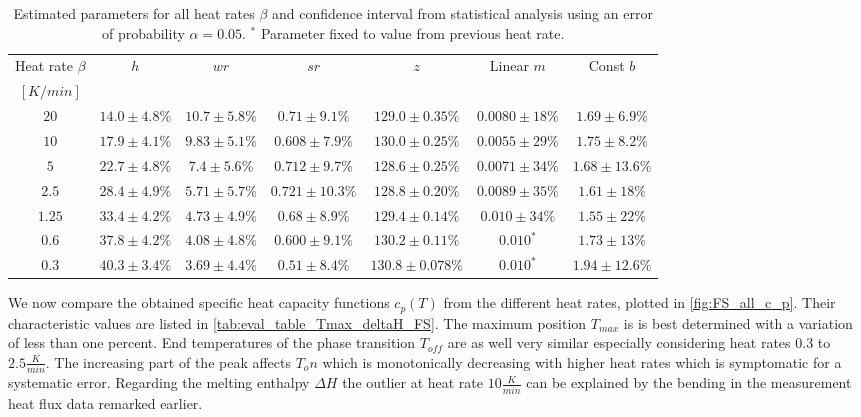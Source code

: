 \documentclass{scrartcl}[12pt, halfparskip]
\numberwithin{equation}{section}
\numberwithin{figure}{section}
\numberwithin{table}{section}
\begin{document}
\begin{table}[H]
	\hspace{-1.2cm}
	\begin{tabular}{| c | c | c | c | c | c | c |} \hline
		Heat rate $\beta$ & $h$ & $wr$ & $sr$ & $z$ & Linear $m$ & Const $b$ \\ 
		$[K/min]$ & & & & & & \\ \hline
		$20$ & $14.0 \pm 4.8\%$ & $10.7 \pm 5.8\%$ & $0.71 \pm 9.1\%$ & $129.0 \pm 0.35\%$ & $0.0080 \pm 18\%$ & $1.69 \pm 6.9\%$ \\
		$10$ & $17.9 \pm 4.1\%$ & $9.83 \pm 5.1\%$ & $0.608 \pm 7.9\%$ & $130.0 \pm 0.25\%$ & $0.0055 \pm 29\%$ & $1.75 \pm 8.2\%$  \\
		$5$ & $22.7 \pm 4.8\%$ & $7.4 \pm 5.6\%$ & $0.712 \pm 9.7\%$ & $128.6 \pm 0.25\%$ & $0.0071 \pm 34\%$ & $1.68 \pm 13.6\%$ \\
		$2.5$ & $28.4 \pm 4.9\%$ & $5.71 \pm 5.7\%$ & $0.721 \pm 10.3\%$ & $128.8 \pm 0.20\%$ & $0.0089 \pm 35\%$ & $1.61 \pm 18\%$ \\
		$1.25$ & $33.4 \pm 4.2\%$ & $4.73 \pm 4.9\%$ & $0.68 \pm 8.9\%$ & $129.4 \pm 0.14\%$ & $0.010 \pm 34\%$ & $1.55 \pm 22\%$ \\
		$0.6$ & $37.8 \pm 4.2\%$ & $4.08 \pm 4.8\%$ & $0.600 \pm 9.1\%$ & $130.2 \pm 0.11\%$ & $0.010^*$ & $1.73 \pm 13\%$ \\
		$0.3$ & $40.3 \pm 3.4\%$ & $3.69 \pm 4.4\%$ & $0.51 \pm 8.4\%$ & $130.8 \pm 0.078\%$ & $0.010^*$ & $1.94 \pm 12.6\%$ \\ \hline
	\end{tabular}
	\caption{Estimated parameters for all heat rates $\beta$ and confidence interval from statistical analysis using an error of probability $\alpha=0.05$. $^*$ Parameter fixed to value from previous heat rate.}
	\label{tab:parameter_table_FS}
\end{table}


We now compare the obtained specific heat capacity functions $c_p(T)$ from the different heat rates, plotted in \cref{fig:FS_all_c_p}. Their characteristic values are listed in \cref{tab:eval_table_Tmax_deltaH_FS}. The maximum position $T_{max}$ is is best determined with a variation of less than one percent. End temperatures of the phase transition $T_{off}$ are as well very similar especially considering heat rates $0.3$ to $2.5 \frac{K}{min}$. The increasing part of the peak affects $T_on$ which is monotonically decreasing with higher heat rates which is symptomatic for a systematic error. Regarding the melting enthalpy $\Delta H$ the outlier at heat rate $10 \frac{K}{min}$ can be explained by the bending in the measurement heat flux data remarked earlier. \\
\end{document}
